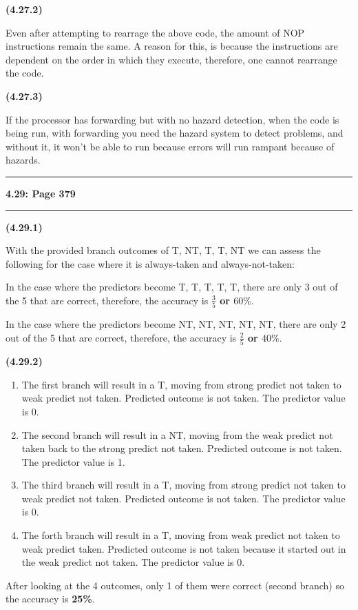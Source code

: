 \documentclass[11pt]{article}
\newcommand\question[2]{\vspace{.25in}\hrule\textbf{#1: #2}\vspace{.5em}\hrule\vspace{.10in}}
\renewcommand\part[1]{\vspace{.10in}\textbf{(#1)}\par}
\begin{document}
	\part{4.27.2}
		Even after attempting to rearrage the above code, the amount of NOP instructions remain the same. A reason for this, is because the instructions are dependent on the order in which they execute, therefore, one cannot rearrange the code.\par
	
	\part{4.27.3}
		If the processor has forwarding but with no hazard detection, when the code is being run, with forwarding you need the hazard system to detect problems, and without it, it won't be able to run because errors will run rampant because of hazards.\par
		
		
\question{4.29}{Page 379}
	\part{4.29.1}
		With the provided branch outcomes of T, NT, T, T, NT we can assess the following for the case where it is always-taken and always-not-taken: \par
		In the case where the predictors become T, T, T, T, T, there are only 3 out of the 5 that are correct, therefore, the accuracy is \textbf{$\frac{3}{5}$ or $60\%$}.\par
		
		In the case where the predictors become NT, NT, NT, NT, NT, there are only 2 out of the 5 that are correct, therefore, the accuracy is \textbf{$\frac{2}{5}$ or $40\%$}.\par 
	
	\part{4.29.2}
		\begin{enumerate}
			\item The first branch will result in a T, moving from strong predict not taken to weak predict not taken. Predicted outcome is not taken. The predictor value is 0.
			\item The second branch will result in a NT, moving from the weak predict not taken back to the strong predict not taken. Predicted outcome is not taken. The predictor value is 1.
			\item The third branch will result in a T, moving from strong predict not taken to weak predict not taken. Predicted outcome is not taken. The predictor value is 0.
			\item The forth branch will result in a T, moving from weak predict not taken to weak predict taken. Predicted outcome is not taken because it started out in the weak predict not taken. The predictor value is 0.
		\end{enumerate}
		After looking at the 4 outcomes, only 1 of them were correct (second branch) so the accuracy is \textbf{25\%}.
\end{document}
